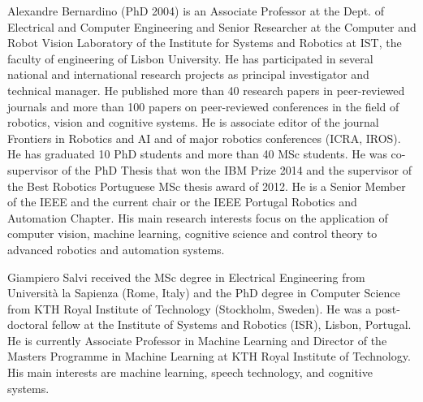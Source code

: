 \begin{IEEEbiography}{Alexandre Bernardino}
  (PhD 2004) is an Associate Professor at the Dept. of Electrical and Computer Engineering and Senior Researcher at the Computer and Robot Vision Laboratory of the Institute for Systems and Robotics at IST, the faculty of engineering of Lisbon University. He has participated in several national and international research projects as principal investigator and technical manager. He published more than 40 research papers in peer-reviewed journals and more than 100 papers on peer-reviewed conferences in the field of robotics, vision and cognitive systems. He is associate editor of the journal Frontiers in Robotics and AI and of major robotics conferences (ICRA, IROS). He has graduated 10 PhD students and more than 40 MSc students. He was co-supervisor of the PhD Thesis that won the IBM Prize 2014 and the supervisor of the Best Robotics Portuguese MSc thesis award of 2012. He is a Senior Member of the IEEE and the current chair or the IEEE Portugal Robotics and Automation Chapter. His main research interests focus on the application of computer vision, machine learning, cognitive science and control theory to advanced robotics and automation systems.
\end{IEEEbiography}

\begin{IEEEbiography}{Giampiero Salvi}
received the MSc degree in Electrical Engineering from Università la Sapienza (Rome, Italy) and the PhD degree in Computer Science from KTH Royal Institute of Technology (Stockholm, Sweden). He was a post-doctoral fellow at the Institute of Systems and Robotics (ISR), Lisbon, Portugal. He is currently Associate Professor in Machine Learning and Director of the Masters Programme in Machine Learning at KTH Royal Institute of Technology. His main interests are machine learning, speech technology, and cognitive systems.
\end{IEEEbiography}
